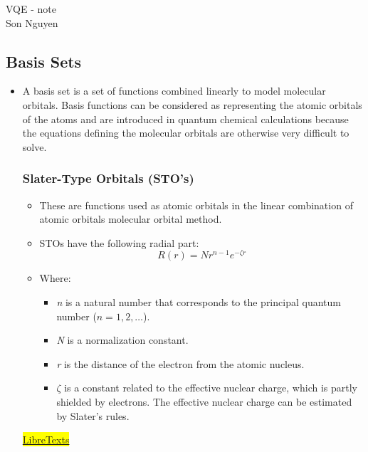 \documentclass{article}
\begin{document}
\begin{center}
    \LARGE{VQE - note}\\[1em]
    \large Son Nguyen\\[1em]
\end{center}

\onehalfspacing
\subsection*{Basis Sets}
\begin{itemize}
    \item A basis set is a set of functions combined linearly to model molecular orbitals. Basis functions can be considered as representing the atomic orbitals of the atoms and are introduced in quantum chemical calculations because the equations defining the molecular 
    orbitals are otherwise very difficult to solve.


\subsubsection*{Slater-Type Orbitals (STO's)}

\begin{itemize}
    \item These are functions used as atomic orbitals in the linear combination of atomic orbitals molecular 
    orbital method.
    \item STOs have the following radial part:
    \begin{equation}
        R(r) = N r^{n-1} e^{-\zeta r}
    \end{equation}
    \item Where:
    \begin{itemize}
        \item \textit{n} is a natural number that corresponds to the principal quantum number (\(n = 1, 2, \dots \)).
        \item \textit{N} is a normalization constant.
        \item \textit{r} is the distance of the electron from the atomic nucleus. 
        \item \(\zeta\) is a constant related to the effective nuclear charge, which is partly shielded by electrons. The effective nuclear charge can be estimated by Slater's rules.
    \end{itemize}
\end{itemize}
\href{https://chem.libretexts.org/Bookshelves/Physical_and_Theoretical_Chemistry_Textbook_Maps/Physical_Chemistry_(LibreTexts)/11%3A_Computational_Quantum_Chemistry/11.02%3A_Gaussian_Basis_Sets}{\colorbox{yellow}{LibreTexts}}


\end{itemize}
\end{document}
